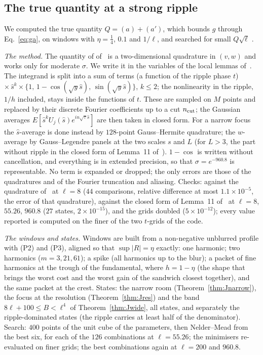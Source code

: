 \subsection{The true quantity at a strong ripple}
\label{sec:truth}
We computed the true quantity $Q=(a)+(a')$, which bounds $g$ through Eq.~\eqref{eq:ga}, on windows with $\eta=\tfrac14$, $0.1$ and $1/\ell$, and searched for small $Q\sqrt\ell$ \numst.

\emph{The method.}
The quantity of  of~\cite{I} is a two-dimensional quadrature in $(v,w)$ and works only for moderate $\sigma$.
We write it in the variables of the local lemmas of~\cite{I}.
The integrand is split into a sum of terms (a function of the ripple phase $t$) $\times\,\hat s^k\times\{1,\,1-\cos(\sqrt y\hat s),\,\sin(\sqrt y\hat s)\}$, $k\le2$; the nonlinearity in the ripple, $1/h$ included, stays inside the functions of $t$.
These are sampled on $M$ points and replaced by their discrete Fourier coefficients up to a cut $n_{\rm cut}$; the Gaussian averages $E[\hat s^kU_j(\hat s)e^{in\sqrt\tau\hat s}]$ are then taken in closed form.
For a narrow focus the $\hat s$-average is done instead by $128$-point Gauss--Hermite quadrature; the $w$-average by Gauss--Legendre panels at the two scales $s$ and $L$ (for $L>3$, the part without ripple in the closed form of Lemma~11 of~\cite{I}).
$1-\cos$ is written without cancellation, and everything is in extended precision, so that $\sigma=e^{-960.8}$ is representable.
No term is expanded or dropped; the only errors are those of the quadratures and of the Fourier truncation and aliasing.
Checks: against the quadrature of~\cite{I} at $\ell=8$ ($44$ comparisons, relative difference at most $1.1\times10^{-5}$, the error of that quadrature), against the closed form of Lemma~11 of~\cite{I} at $\ell=8$, $55.26$, $960.8$ ($27$ states, $2\times10^{-15}$), and the grids doubled ($5\times10^{-12}$); every value reported is computed on the finer of the two $t$-grids of the code.

\emph{The windows and states.}
Windows are built from a non-negative unblurred profile with (P2) and (P3), aligned so that $\sup|R|=\eta$ exactly: one harmonic; two harmonics ($m=3,21,61$); a spike (all harmonics up to the blur); a packet of fine harmonics at the trough of the fundamental, where $h=1-\eta$ (the shape that brings the worst cost and the worst gain of the sandwich closest together), and the same packet at the crest.
States: the narrow room (Theorem~\ref{thm:Jnarrow}), the focus at the resolution (Theorem~\ref{thm:Jres}) and the band $8\ell+100\le B<\ell^4$ of Theorem~\ref{thm:Jwide}, all states, and separately the ripple-dominated states (the ripple carries at least half of the denominator).
Search: $400$ points of the unit cube of the parameters, then Nelder--Mead from the best six, for each of the $126$ combinations at $\ell=55.26$; the minimisers re-evaluated on finer grids; the best combinations again at $\ell=200$ and $960.8$.


